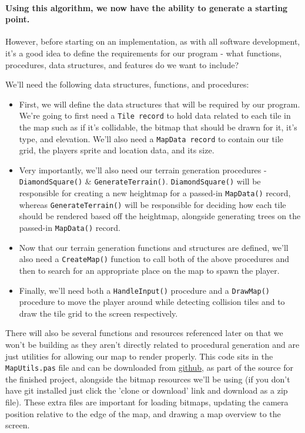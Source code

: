 \documentclass{article}
\begin{document}
\paragraph{Using this algorithm, we now have the ability to generate a starting point.}
However, before starting on an implementation, as with all software development, it's a good idea to define the requirements for our program - what functions, procedures, data structures, and features do we want to include?

We'll need the following data structures, functions, and procedures:
\begin{itemize}

\item
	First, we will define the data structures that will be required by our program. We're going to first need a \texttt{Tile record} to hold data related to each tile in the map such as if it's collidable, the bitmap that should be drawn for it, it's type, and elevation. We'll also need a \texttt{MapData record} to contain our tile grid, the players sprite and location data, and its size.
\item
	Very importantly, we'll also need our terrain generation procedures - \texttt{DiamondSquare()} \& \texttt{GenerateTerrain()}. \texttt{DiamondSquare()} will be responsible for creating a new heightmap for a passed-in \texttt{MapData()} record, whereas \texttt{GenerateTerrain()} will be responsible for deciding how each tile should be rendered based off the heightmap, alongside generating trees on the passed-in \texttt{MapData()} record.
\item
	Now that our terrain generation functions and structures are defined, we'll also need a \texttt{CreateMap()} function to call both of the above procedures and then to search for an appropriate place on the map to spawn the player.
\item
	Finally, we'll need both a \texttt{HandleInput()} procedure and a \texttt{DrawMap()} procedure to move the player around while detecting collision tiles and to draw the tile grid to the screen respectively.
	
\end{itemize}

There will also be several functions and resources referenced later on that we won't be building as they aren't directly related to procedural generation and are just utilities for allowing our map to render properly. This code sits in the \texttt{MapUtils.pas} file and can be downloaded from \href{https://github.com/jacobmilligan/intro_hd_report}{github}, as part of the source for the finished project, alongside the bitmap resources we'll be using (if you don't have git installed just click the 'clone or download' link and download as a zip file). These extra files are important for loading bitmaps, updating the camera position relative to the edge of the map, and drawing a map overview to the screen.
\end{document}
